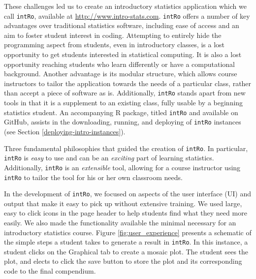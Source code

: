 \documentclass[12pt,]{article}
\begin{document}
These challenges led us to create an introductory statistics application
which we call \texttt{intRo}, available at
\url{http://www.intro-stats.com}. \texttt{intRo} offers a number of key
advantages over traditional statistics software, including ease of
access and an aim to foster student interest in coding. Attempting to
entirely hide the programming aspect from students, even in introductory
classes, is a lost opportunity to get students interested in statistical
computing. It is also a lost opportunity reaching students who learn
differently or have a computational background. Another advantage is its
modular structure, which allows course instructors to tailor the
application towards the needs of a particular class, rather than accept
a piece of software as is. Additionally, \texttt{intRo} stands apart
from new tools in that it is a supplement to an existing class, fully
usable by a beginning statistics student. An accompanying R package,
titled \texttt{intRo} and available on GitHub, assists in the
downloading, running, and deploying of \texttt{intRo} instances (see
Section \ref{deploying-intro-instances}).

Three fundamental philosophies that guided the creation of
\texttt{intRo}. In particular, \texttt{intRo} is \emph{easy} to use and
can be an \emph{exciting} part of learning statistics. Additionally,
\texttt{intRo} is an \emph{extensible} tool, allowing for a course
instructor using \texttt{intRo} to tailor the tool for his or her own
classroom needs.

In the development of \texttt{intRo}, we focused on aspects of the user
interface (UI) and output that make it easy to pick up without extensive
training. We used large, easy to click icons in the page header to help
students find what they need more easily. We also made the functionality
available the minimal necessary for an introductory statistics course.
Figure \ref{fig:user_experience} presents a schematic of the simple
steps a student takes to generate a result in \texttt{intRo}. In this
instance, a student clicks on the Graphical tab to create a mosaic plot.
The student sees the plot, and elects to click the save button to store
the plot and its corresponding code to the final compendium.
\end{document}
